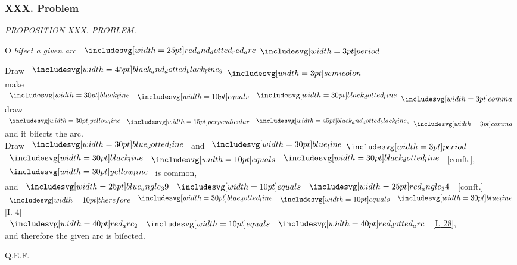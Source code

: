 \documentclass[12pt,preview]{standalone}
\begin{document}
\subsubsection{XXX. Problem}

\begin{minipage}[t]{0.64\textwidth}
    \vspace{0pt}

    \begin{center}
        \textit{PROPOSITION XXX. PROBLEM.}\label{book3pr30} \\
    \end{center}

    \hfill

    \begin{center}
        \raggedright \lettrine[lines=4, loversize=1, nindent=0pt]{}{}O \textit{biſect a given arc} $\img{red_and_dotted_red_arc} \bperiod$
    \end{center}

    \hfill

    \hfill

    \hfill

    \hfill

    \begin{center}
        Draw $\bimg{black_and_dotted_black_line_9} \bsemicolon$\\
        make $\blackline \bequals \dottedblackline \bcomma$\\
        draw $\yellowline \bperp \bimg{black_and_dotted_black_line_9} \bcomma$  and it biſects the arc.\\
        Draw $\dottedblueline$ and $\blueline \bperiod$\\
        $\blackline \bequals \dottedblackline$ [conſt.],\\
        $\yellowline$ is common,\\
        and $\img{blue_angle_39} \bequals \img{red_angle_34}$ [conſt.]\\
        $\btherefore \dottedblueline \bequals \blueline$ [\hyperref[book1pr4]{\textsc{I.} 4}]\\
        $\img[0][0][40]{red_arc_2} \bequals \img[0][0][40]{red_dotted_arc}$ [\hyperref[book3pr28]{\textsc{I.} 28}],\\
        and therefore the given arc is biſected.
    \end{center}

    \hfill

    \hfill Q.E.F.
\end{minipage}%
\hfill
\begin{minipage}[t]{0.33\textwidth}
    \vspace{40pt}
    
\end{minipage}%
\end{document}
